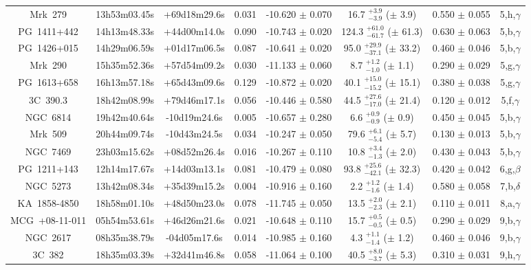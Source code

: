 \documentclass[a4paper,fleqn,usenatbib]{mnras}
\begin{document}
\begin{appendix}
\begin{longtable}{cccccccc}
Mrk~279 & 13h53m03.45s & +69d18m29.6s & 0.031 & -10.620 $\pm$ 0.070 & 16.7 $_{-3.9}^{+3.9}$ ($\pm$ 3.9) & 0.550 $\pm$ 0.055 & 5,h,$\gamma$ \\
PG~1411+442 & 14h13m48.33s & +44d00m14.0s & 0.090 & -10.743 $\pm$ 0.020 & 124.3 $_{-61.7}^{+61.0}$ ($\pm$ 61.3) & 0.630 $\pm$ 0.063 & 5,b,$\gamma$ \\
PG~1426+015 & 14h29m06.59s & +01d17m06.5s & 0.087 & -10.641 $\pm$ 0.020 & 95.0 $_{-37.1}^{+29.9}$ ($\pm$ 33.2) & 0.460 $\pm$ 0.046 & 5,b,$\gamma$ \\
Mrk~290 & 15h35m52.36s & +57d54m09.2s & 0.030 & -11.133 $\pm$ 0.060 & 8.7 $_{-1.0}^{+1.2}$ ($\pm$ 1.1) & 0.290 $\pm$ 0.029 & 5,g,$\gamma$ \\
PG~1613+658 & 16h13m57.18s & +65d43m09.6s & 0.129 & -10.872 $\pm$ 0.020 & 40.1 $_{-15.2}^{+15.0}$ ($\pm$ 15.1) & 0.380 $\pm$ 0.038 & 5,g,$\gamma$ \\
3C~390.3 & 18h42m08.99s & +79d46m17.1s & 0.056 & -10.446 $\pm$ 0.580 & 44.5 $_{-17.0}^{+27.6}$ ($\pm$ 21.4) & 0.120 $\pm$ 0.012 & 5,f,$\gamma$ \\
NGC~6814 & 19h42m40.64s & -10d19m24.6s & 0.005 & -10.657 $\pm$ 0.280 & 6.6 $_{-0.9}^{+0.9}$ ($\pm$ 0.9) & 0.450 $\pm$ 0.045 & 5,b,$\gamma$ \\
Mrk~509 & 20h44m09.74s & -10d43m24.5s & 0.034 & -10.247 $\pm$ 0.050 & 79.6 $_{-5.4}^{+6.1}$ ($\pm$ 5.7) & 0.130 $\pm$ 0.013 & 5,b,$\gamma$ \\
NGC~7469 & 23h03m15.62s & +08d52m26.4s & 0.016 & -10.267 $\pm$ 0.110 & 10.8 $_{-1.3}^{+3.4}$ ($\pm$ 2.0) & 0.430 $\pm$ 0.043 & 5,b,$\gamma$ \\
PG~1211+143 & 12h14m17.67s & +14d03m13.1s & 0.081 & -10.479 $\pm$ 0.080 & 93.8 $_{-42.1}^{+25.6}$ ($\pm$ 32.3) & 0.420 $\pm$ 0.042 & 6,g,$\beta$ \\
NGC~5273 & 13h42m08.34s & +35d39m15.2s & 0.004 & -10.916 $\pm$ 0.160 & 2.2 $_{-1.6}^{+1.2}$ ($\pm$ 1.4) & 0.580 $\pm$ 0.058 & 7,b,$\delta$ \\
KA~1858-4850 & 18h58m01.10s & +48d50m23.0s & 0.078 & -11.745 $\pm$ 0.050 & 13.5 $_{-2.3}^{+2.0}$ ($\pm$ 2.1) & 0.110 $\pm$ 0.011 & 8,a,$\gamma$ \\
MCG~+08-11-011 & 05h54m53.61s & +46d26m21.6s & 0.021 & -10.648 $\pm$ 0.110 & 15.7 $_{-0.5}^{+0.5}$ ($\pm$ 0.5) & 0.290 $\pm$ 0.029 & 9,b,$\gamma$ \\
NGC~2617 & 08h35m38.79s & -04d05m17.6s & 0.014 & -10.985 $\pm$ 0.160 & 4.3 $_{-1.4}^{+1.1}$ ($\pm$ 1.2) & 0.460 $\pm$ 0.046 & 9,b,$\gamma$ \\
3C~382 & 18h35m03.39s & +32d41m46.8s & 0.058 & -11.064 $\pm$ 0.100 & 40.5 $_{-3.7}^{+8.0}$ ($\pm$ 5.3) & 0.310 $\pm$ 0.031 & 9,h,$\gamma$ \\

\end{longtable}
\end{appendix}
\end{document}
